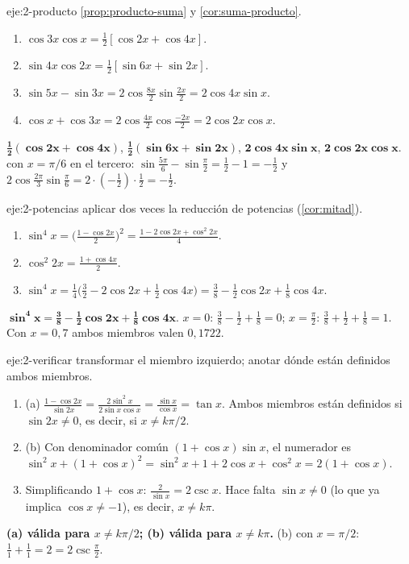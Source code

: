 \begin{solucion}{eje:2-producto}
\planteamiento \cref{prop:producto-suma} y \cref{cor:suma-producto}.
\pasos
\begin{enumerate}[label=\arabic*.]
  \item $\cos3x\cos x=\frac12[\cos2x+\cos4x]$.
  \item $\sin4x\cos2x=\frac12[\sin6x+\sin2x]$.
  \item $\sin5x-\sin3x=2\cos\frac{8x}{2}\sin\frac{2x}{2}=2\cos4x\sin x$.
  \item $\cos x+\cos3x=2\cos\frac{4x}{2}\cos\frac{-2x}{2}=2\cos2x\cos x$.
\end{enumerate}
\resultado $\mathbf{\tfrac12(\cos2x+\cos4x)}$, $\mathbf{\tfrac12(\sin6x+\sin2x)}$, $\mathbf{2\cos4x\sin x}$, $\mathbf{2\cos2x\cos x}$.
\comprobacion con $x=\pi/6$ en el tercero: $\sin\frac{5\pi}{6}-\sin\frac{\pi}{2}=\frac12-1=-\frac12$ y $2\cos\frac{2\pi}{3}\sin\frac{\pi}{6}=2\cdot(-\frac12)\cdot\frac12=-\frac12$.
\end{solucion}

\begin{solucion}{eje:2-potencias}
\planteamiento aplicar dos veces la reducción de potencias (\cref{cor:mitad}).
\pasos
\begin{enumerate}[label=\arabic*.]
  \item $\sin^{4}x=\bigl(\frac{1-\cos2x}{2}\bigr)^{2}=\frac{1-2\cos2x+\cos^{2}2x}{4}$.
  \item $\cos^{2}2x=\frac{1+\cos4x}{2}$.
  \item $\sin^{4}x=\frac{1}{4}\bigl(\frac32-2\cos2x+\frac12\cos4x\bigr)=\frac38-\frac12\cos2x+\frac18\cos4x$.
\end{enumerate}
\resultado $\mathbf{\sin^{4}x=\frac38-\frac12\cos2x+\frac18\cos4x}$.
\comprobacion $x=0$: $\frac38-\frac12+\frac18=0$; $x=\frac{\pi}{2}$: $\frac38+\frac12+\frac18=1$. Con $x=0{,}7$ ambos miembros valen $0{,}1722$.
\end{solucion}

\begin{solucion}{eje:2-verificar}
\planteamiento transformar el miembro izquierdo; anotar dónde están definidos ambos miembros.
\pasos
\begin{enumerate}[label=\arabic*.]
  \item (a) $\frac{1-\cos2x}{\sin2x}=\frac{2\sin^{2}x}{2\sin x\cos x}=\frac{\sin x}{\cos x}=\tan x$. Ambos miembros están definidos si $\sin2x\ne0$, es decir, si $x\ne k\pi/2$.
  \item (b) Con denominador común $(1+\cos x)\sin x$, el numerador es $\sin^{2}x+(1+\cos x)^{2}=\sin^{2}x+1+2\cos x+\cos^{2}x=2(1+\cos x)$.
  \item Simplificando $1+\cos x$: $\frac{2}{\sin x}=2\csc x$. Hace falta $\sin x\ne0$ (lo que ya implica $\cos x\ne-1$), es decir, $x\ne k\pi$.
\end{enumerate}
\resultado \textbf{(a) válida para $x\ne k\pi/2$; (b) válida para $x\ne k\pi$.}
\comprobacion (b) con $x=\pi/2$: $\frac11+\frac11=2=2\csc\frac{\pi}{2}$.
\end{solucion}

